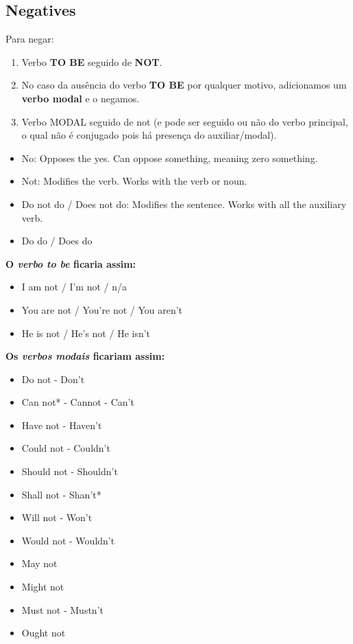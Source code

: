 \documentclass[12pt,a4paper]{article} %
\begin{document}
\subsection{Negatives}
	Para negar:
	\begin{enumerate}
	\item Verbo \textbf{TO BE} seguido de \textbf{NOT}.
	\item No caso da ausência do verbo \textbf{TO BE} por qualquer motivo, adicionamos um \textbf{verbo modal} e o negamos.
	\item Verbo MODAL seguido de not (e pode ser seguido ou não do verbo principal, o qual não é conjugado pois há presença do auxiliar/modal).
	\end{enumerate}
	\begin{itemize}
		\item No: Opposes the yes. Can oppose something, meaning zero something.
		\item Not: Modifies the verb. Works with the verb or noun.
		\item Do not do / Does not do: Modifies the sentence. Works with all the auxiliary verb.
		\item Do do / Does do
	\end{itemize}
	\textbf{O \textit{verbo to be} ficaria assim:}
	\begin{itemize}
		\item I am not / I'm not / n/a
		\item You are not / You're not / You aren't
		\item He is not / He's not / He isn't
	\end{itemize}
	\textbf{Os \textit{verbos modais} ficariam assim:}
	\begin{itemize}
		\item Do not - Don't
		\item Can not* - Cannot - Can't
		\item Have not - Haven't
		\item Could not - Couldn't
		\item Should not - Shouldn't
		\item Shall not - Shan't*
		\item Will not - Won't
		\item Would not - Wouldn't
		\item May not
		\item Might not
		\item Must not - Mustn't
		\item Ought not
	\end{itemize}
\end{document}
